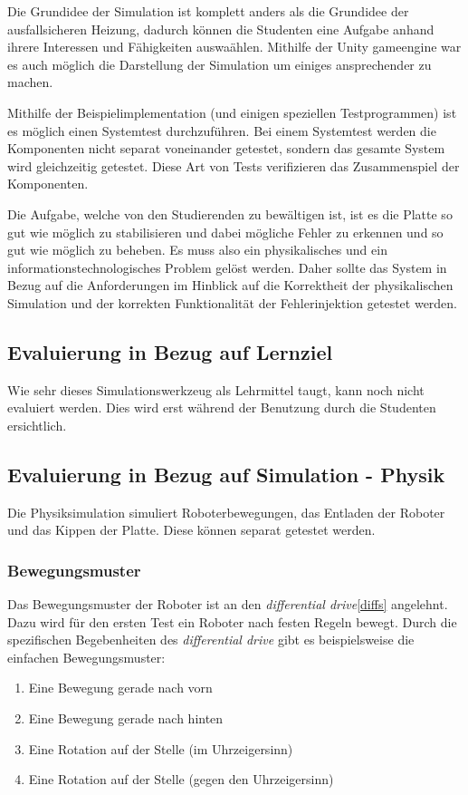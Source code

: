 {Die Grundidee der Simulation ist komplett anders als die Grundidee der ausfallsicheren Heizung, dadurch k{\"{o}}nnen
die Studenten eine Aufgabe anhand ihrere Interessen und F{\"{a}}higkeiten auswa{\"{a}}hlen. Mithilfe der Unity gameengine
war es auch m{\"{o}}glich die Darstellung der Simulation um einiges ansprechender zu machen.


Mithilfe der Beispielimplementation (und einigen speziellen Testprogrammen) ist es m{\"{o}}glich einen Systemtest
durchzuf{\"{u}}hren. Bei einem Systemtest werden die Komponenten nicht separat voneinander getestet, sondern das
gesamte System wird gleichzeitig getestet. Diese Art von Tests verifizieren das Zusammenspiel der Komponenten.

Die Aufgabe, welche von den Studierenden zu bew{\"{a}}ltigen ist, ist es die Platte so gut wie m{\"{o}}glich zu
stabilisieren und dabei m{\"{o}}gliche Fehler zu erkennen und so gut wie m{\"{o}}glich zu beheben. Es muss also
ein physikalisches und ein informationstechnologisches Problem gel{\"{o}}st werden. Daher sollte das System in
Bezug auf die Anforderungen im Hinblick auf die Korrektheit der physikalischen Simulation und der korrekten
Funktionalit{\"{a}}t der Fehlerinjektion getestet werden.

\subsection{Evaluierung in Bezug auf Lernziel}
Wie sehr dieses Simulationswerkzeug als Lehrmittel taugt, kann noch nicht evaluiert werden. Dies wird erst w{\"{a}}hrend
der Benutzung durch die Studenten ersichtlich.

\subsection{Evaluierung in Bezug auf Simulation - Physik}
Die Physiksimulation simuliert Roboterbewegungen, das Entladen der Roboter und das Kippen der Platte. Diese k{\"{o}}nnen
separat getestet werden.

\subsubsection{Bewegungsmuster}
Das Bewegungsmuster der Roboter ist an den \textit{differential drive}\ref{diffs} angelehnt. Dazu wird f{\"{u}}r den ersten Test ein
Roboter nach festen Regeln bewegt. Durch die spezifischen Begebenheiten des \textit{differential drive} gibt es beispielsweise die einfachen
Bewegungsmuster:
\begin{enumerate}
	\item Eine Bewegung gerade nach vorn
	\item Eine Bewegung gerade nach hinten
	\item Eine Rotation auf der Stelle (im Uhrzeigersinn)
	\item Eine Rotation auf der Stelle (gegen den Uhrzeigersinn)
\end{enumerate}

}
